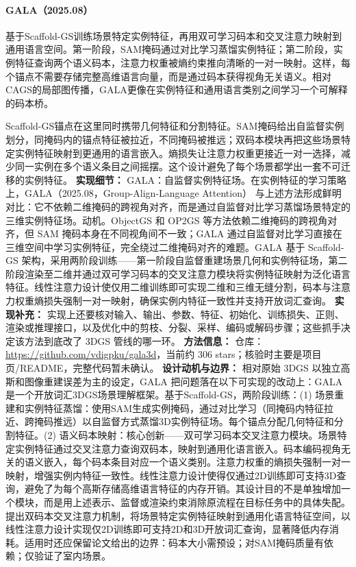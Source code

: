 \paragraph{GALA（2025.08）\cite{2508_14278}}
基于Scaffold-GS训练场景特定实例特征，再用双可学习码本和交叉注意力映射到通用语言空间。第一阶段，SAM掩码通过对比学习蒸馏实例特征；第二阶段，实例特征查询两个语义码本，注意力权重被熵约束推向清晰的一对一映射。这样，每个锚点不需要存储完整高维语言向量，而是通过码本获得视角无关语义。相对CAGS的局部图传播，GALA更像在实例特征和通用语言类别之间学习一个可解释的码本桥。

Scaffold-GS锚点在这里同时携带几何特征和分割特征。SAM掩码给出自监督实例划分，同掩码内的锚点特征被拉近，不同掩码被推远；双码本模块再把这些场景特定实例特征映射到更通用的语言嵌入。熵损失让注意力权重更接近一对一选择，减少同一实例在多个语义条目之间摇摆。这个设计避免了每个场景都学出一套不可迁移的实例特征。
\textbf{实现细节：} GALA：自监督实例特征场。在实例特征的学习策略上，GALA（2025.08，Group-Align-Language Attention） 与上述方法形成鲜明对比：它不依赖二维掩码的跨视角对齐，而是通过自监督对比学习蒸馏场景特定的三维实例特征场。动机。ObjectGS 和 OP2GS 等方法依赖二维掩码的跨视角对齐，但 SAM 掩码本身在不同视角间不一致；GALA 通过自监督对比学习直接在三维空间中学习实例特征，完全绕过二维掩码对齐的难题。GALA 基于 Scaffold-GS 架构，采用两阶段训练——第一阶段自监督重建场景几何和实例特征场，第二阶段渲染至二维并通过双可学习码本的交叉注意力模块将实例特征映射为泛化语言特征。线性注意力设计使仅用二维训练即可实现二维和三维无缝分割，码本与注意力权重熵损失强制一对一映射，确保实例内特征一致性并支持开放词汇查询。
\textbf{实现补充：} 实现上还要核对输入、输出、参数、特征、初始化、训练损失、正则、渲染或推理接口，以及优化中的剪枝、分裂、采样、编码或解码步骤；这些抓手决定该方法到底改了 3DGS 管线的哪一环。
\textbf{方法信息：} 仓库：\url{https://github.com/vdigpku/gala3d}，当前约 306 stars；核验时主要是项目页/README，完整代码暂未确认。
\textbf{设计动机与边界：} 相对原始 3DGS 以独立高斯和图像重建误差为主的设定，GALA 把问题落在以下可实现的改动上：GALA是一个开放词汇3DGS场景理解框架。基于Scaffold-GS，两阶段训练：(1) 场景重建和实例特征蒸馏：使用SAM生成实例掩码，通过对比学习（同掩码内特征拉近、跨掩码推远）以自监督方式蒸馏3D实例特征场。每个锚点分配几何特征和分割特征。(2) 语义码本映射：核心创新——双可学习码本交叉注意力模块。场景特定实例特征通过交叉注意力查询双码本，映射到通用化语言嵌入。码本编码视角无关的语义嵌入，每个码本条目对应一个语义类别。注意力权重的熵损失强制一对一映射，增强实例内特征一致性。线性注意力设计使得仅通过2D训练即可支持3D查询，避免了为每个高斯存储高维语言特征的内存开销。其设计目的不是单独增加一个模块，而是用上述表示、监督或渲染约束消除原流程在目标任务中的具体失配。提出双码本交叉注意力机制，将场景特定实例特征映射到通用化语言特征空间，以线性注意力设计实现仅2D训练即可支持2D和3D开放词汇查询，显著降低内存消耗。适用时还应保留论文给出的边界：码本大小需预设；对SAM掩码质量有依赖；仅验证了室内场景。
